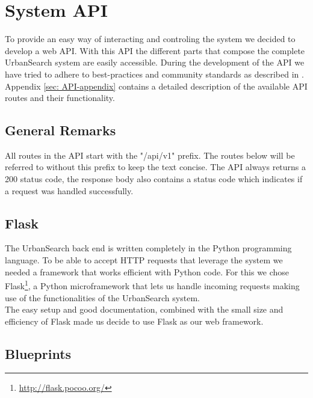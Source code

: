 \section{System API}\label{sec: 5-API}
To provide an easy way of interacting and controling the system we decided to develop a web API. With this API the different parts that compose the complete UrbanSearch system are easily accessible. During the development of the API we have tried to adhere to best-practices and community standards as described in \cite{apigee}. Appendix \ref{sec: API-appendix} contains a detailed description of the available API routes and their functionality.

\subsection{General Remarks}

All routes in the API start with the "/api/v1" prefix. The routes below will be referred to without this prefix to keep the text concise. The API always returns a 200 status code, the response body also contains a status code which indicates if a request was handled successfully.

\subsection{Flask}
The UrbanSearch back end is written completely in the Python programming language. To be able to accept HTTP requests that leverage the system we needed a framework that works efficient with Python code. For this we chose Flask\footnote{\url{http://flask.pocoo.org/}}, a Python microframework that lets us handle incoming requests making use of the functionalities of the UrbanSearch system.\\
The easy setup and good documentation, combined with the small size and efficiency of Flask made us decide to use Flask as our web framework.

\subsection{Blueprints}